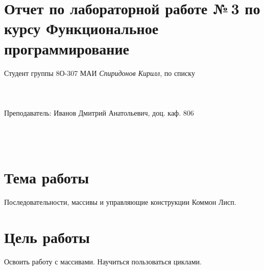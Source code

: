 \documentclass[12pt]{article}
\begin{document}
\section*{Отчет по лабораторной работе №\,3
по курсу \guillemotleft  Функциональное программирование\guillemotright}
\begin{flushright}
Студент группы 8О-307 МАИ \textit{Спиридонов Кирилл},  по списку \\
 \\
 \\
\ \\
Преподаватель: Иванов Дмитрий Анатольевич, доц. каф. 806 \\
 \\
 \\
 \\

\end{flushright}

\section{Тема работы}
{\large Последовательности, массивы и управляющие конструкции Коммон Лисп. \par}

\section{Цель работы}
{\large Освоить работу с массивами. Научиться пользоваться циклами.\par}
\end{document}
